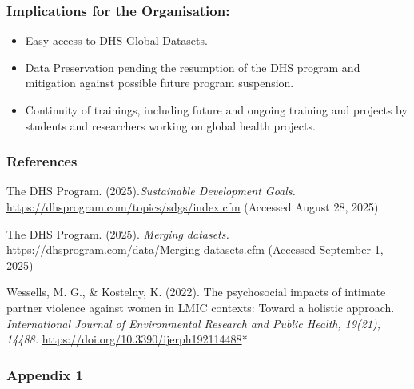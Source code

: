 \documentclass[
]{article}
\providecommand{\tightlist}{%
  \setlength{\itemsep}{0pt}\setlength{\parskip}{0pt}}
\begin{document}
\subsubsection{Implications for the
Organisation:}\label{implications-for-the-organisation}

\begin{itemize}
\tightlist
\item
  Easy access to DHS Global Datasets.
\item
  Data Preservation pending the resumption of the DHS program and
  mitigation against possible future program suspension.
\item
  Continuity of trainings, including future and ongoing training and
  projects by students and researchers working on global health
  projects.
\end{itemize}

\subsubsection{References}\label{references}

The DHS Program. (2025).\emph{Sustainable Development Goals.}
\url{https://dhsprogram.com/topics/sdgs/index.cfm} (Accessed August 28,
2025)

The DHS Program. (2025). \emph{Merging datasets.}
\url{https://dhsprogram.com/data/Merging-datasets.cfm} (Accessed
September 1, 2025)

Wessells, M. G., \& Kostelny, K. (2022). The psychosocial impacts of
intimate partner violence against women in LMIC contexts: Toward a
holistic approach. \emph{International Journal of Environmental Research
and Public Health, 19(21), 14488.}
\url{https://doi.org/10.3390/ijerph192114488}*

\subsubsection{Appendix 1}\label{appendix-1}
\end{document}
